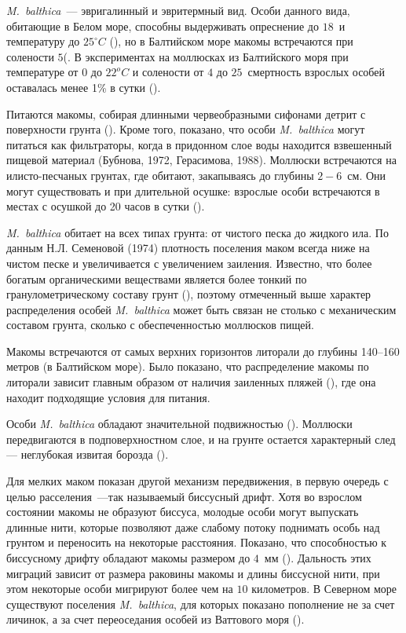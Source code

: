 \textit{M.~balthica}~--- эвригалинный и эвритермный вид. 
Особи данного вида, обитающие в Белом море, способны выдерживать опреснение до $18$\permil\ и температуру до $25^{\circ}C$ (\cite{Naumov_2006}), но в Балтийском море макомы встречаются при солености $5$\permil (\cite{Karpevich_Shurin_1970}.
В экспериментах на моллюсках из Балтийского моря при температуре от $0$ до $22^oC$ и солености от $4$ до $25$\permil\ смертность взрослых особей оставалась менее 1\% в сутки (\cite{Karpevich_1968}).

Питаются макомы, собирая длинными червеобразными сифонами детрит с поверхности грунта (\cite{Naumov_2006}). 
Кроме того, показано, что особи \textit{M.~balthica} могут питаться как фильтраторы, когда в придонном слое воды находится взвешенный пищевой материал (Бубнова, 1972, Герасимова, 1988). 
Моллюски встречаются на илисто-песчаных грунтах, где обитают, закапываясь до глубины $2-6$~см. 
Они могут существовать и при длительной осушке: взрослые особи встречаются в местах с осушкой до 20 часов в сутки (\cite{Sveshnikov_1963}). 

\textit{M.~balthica} обитает на всех типах грунта: от чистого песка до жидкого ила. 
По данным Н.Л. Семеновой (1974) плотность поселения маком всегда ниже на чистом песке и увеличивается с увеличением заиления. 
Известно, что более богатым органическими веществами является более тонкий по гранулометрическому составу грунт (\cite{Bubnova_1972}), поэтому отмеченный выше характер распределения особей \textit{M.~balthica} может быть связан не столько с механическим составом грунта, сколько с обеспеченностью моллюсков пищей.

Макомы встречаются от самых верхних горизонтов литорали до глубины 140–160 метров (в Балтийском море). 
Было показано, что распределение макомы по литорали зависит главным образом от наличия заиленных пляжей (\cite{Semenova_1974}), где она находит подходящие условия для питания. 
	
Особи \textit{M.~balthica} обладают значительной подвижностью (\cite{Sveshnikov_1963}). 
Моллюски передвигаются в подповерхностном слое, и на грунте остается характерный след --- неглубокая извитая борозда (\cite{Naumov_2006}). 

Для мелких маком показан другой механизм передвижения, в первую очередь с целью расселения~---так называемый биссусный дрифт. 
Хотя во взрослом состоянии макомы не образуют биссуса, молодые особи могут выпускать длинные нити, которые позволяют даже слабому потоку поднимать особь над грунтом и переносить на некоторые расстояния. 
Показано, что способностью к биссусному дрифту обладают макомы размером до $4$~мм (\cite{Armonies_Hellwig-Armonies_1992}). 
Дальность этих миграций зависит от размера раковины макомы и длины биссусной нити, при этом некоторые особи мигрируют более чем на $10$ километров. 
В Северном море существуют поселения \textit{M.~balthica}, для которых показано пополнение не за счет личинок, а за счет переоседания особей из Ваттового моря (\cite{Beukema_deVlas_1989}).



